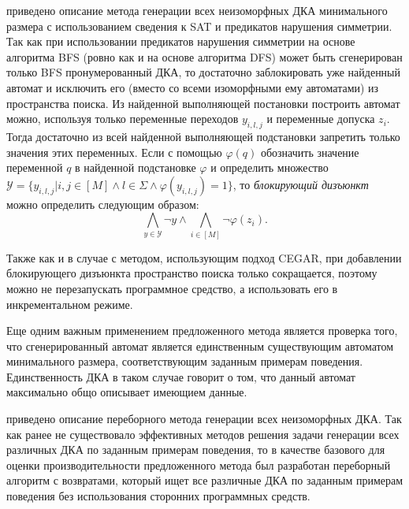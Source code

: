 
\insection{\ref{sec:findall:SAT-based}} приведено описание метода генерации всех неизоморфных ДКА минимального размера с использованием сведения к SAT и предикатов нарушения симметрии.
Так как при использовании предикатов нарушения симметрии на основе алгоритма BFS (ровно как и на основе алгоритма DFS) может быть сгенерирован только BFS пронумерованный ДКА, то достаточно заблокировать уже найденный автомат и исключить его (вместо со всеми изоморфными ему автоматами) из пространства поиска.
Из найденной выполняющей постановки построить автомат можно, используя только переменные переходов $y_{i,l,j}$ и переменные допуска $z_{i}$.
Тогда достаточно из всей найденной выполняющей подстановки запретить только значения этих переменных.
Если с помощью $\varphi\left(q\right)$ обозначить значение переменной $q$ в найденной подстановке $\varphi$ и определить множество $\mathcal{Y} = \{y_{i,l,j} | i,j \in \left[M\right] \wedge l \in \Sigma \wedge \varphi\left(y_{i,l,j}\right) = 1\}$, то \emph{блокирующий дизъюнкт} можно определить следующим образом:
\begin{equation*}
\bigwedge_{y \in \mathcal{Y}} \neg y \wedge \bigwedge_{i \in \left[M\right]}\neg \varphi\left(z_{i}\right).
\end{equation*}

Также как и в случае с методом, использующим подход CEGAR, при добавлении блокирующего дизъюнкта пространство поиска только сокращается, поэтому можно не перезапускать программное средство, а использовать его в инкрементальном режиме.

Еще одним важным применением предложенного метода является проверка того, что сгенерированный автомат является единственным существующим автоматом минимального размера, соответствующим заданным примерам поведения.
Единственность ДКА в таком случае говорит о том, что данный автомат максимально общо описывает имеющием данные.

\insection{\ref{sec:findall:backtracking}} приведено описание переборного метода генерации всех неизоморфных ДКА. 
Так как ранее не существовало эффективных методов решения задачи генерации всех различных ДКА по заданным примерам поведения, то в качестве базового для оценки производительности предложенного метода был разработан переборный алгоритм с возвратами, который ищет все различные ДКА по заданным примерам поведения без использования сторонних программных средств.

